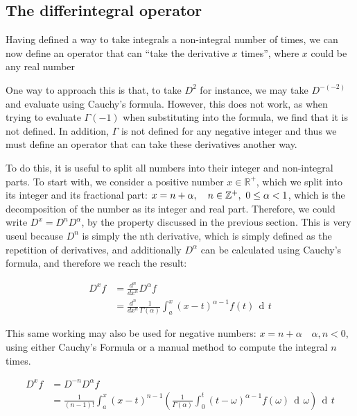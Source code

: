 \documentclass{article}
\def\squad{\hskip2\fontdimen3\font}
\DeclareMathOperator{\di}{\,d\!}
\begin{document}
\subsection{The differintegral operator}
Having defined a way to take integrals a non-integral number of times, we can
now define an operator that can ``take the derivative $x$ times'', where
$x$ could be any real number

One way to approach this is that, to take $D^2$ for instance, we may take
$D^{-\left(-2\right)}$ and evaluate using Cauchy's formula. However, this does
not work, as when trying to evaluate $\Gamma(-1)$ when substituting into the
formula, we find that it is not defined. In addition, $\Gamma$ is not defined
for any negative integer and thus we must define an operator that can take
these derivatives another way.

To do this, it is useful to split all numbers into their integer and
non-integral parts. To start with, we consider a positive number $x \in
\mathbb{R}^+$, which we split into its integer and its fractional part: $x = n +
\alpha, \quad n \in \mathbb{Z}^+, \squad 0 \leq \alpha < 1$, which is the
decomposition of the number as its integer and real part. Therefore, we could
write $D^x=D^nD^\alpha$, by the property discussed in the previous
section. This is very useul because $D^n$ is simply the nth derivative, which
is simply defined as the repetition of derivatives, and additionally $D^\alpha$
can be calculated using Cauchy's formula, and therefore we reach the result:

\begin{align*}
	D^x f   &= \frac{d^n}{dx^n} D^\alpha f \\
			&= \frac{d^n}{dx^n} \frac{1}{\Gamma\left(\alpha\right)}
			 \int_a^x (x-t)^{\alpha-1} f(t) \di t
\end{align*}

This same working may also be used for negative numbers: $x = n + \alpha \quad
\alpha,n < 0$, using either Cauchy's Formula or a manual method to compute the
integral $n$ times.

\begin{align*}
	D^x f   &= D^{-n} D^\alpha f \\
			&= \frac{1}{(n-1)!} \int_a^x (x-t)^{n-1}
			 \left(\frac{1}{\Gamma\left(\alpha\right)}
			 \int_0^t (t-\omega)^{\alpha - 1} f(\omega) \di \omega\right)\di t
\end{align*}
\end{document}
